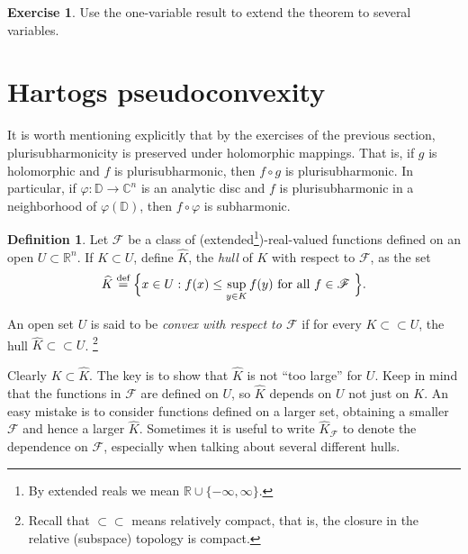 \documentclass[12pt,openany]{book}
\newcommand{\C}{{\mathbb{C}}}
\newcommand{\R}{{\mathbb{R}}}
\newcommand{\D}{{\mathbb{D}}}
\newcommand{\sF}{{\mathscr{F}}}
\newcommand{\myindex}[1]{#1\index{#1}}
\theoremstyle{plain}
\theoremstyle{remark}
\theoremstyle{definition}
\newtheorem{defn}[thm]{Definition}
\newenvironment{exbox}{%
    \def\FrameCommand{\vrule width 1pt \relax\hspace{10pt}}%
    \MakeFramed {\advance \hsize -\width \FrameRestore}%
}{%
    \endMakeFramed
}
\theoremstyle{exercise}
\newtheorem{exercise}{Exercise}[section]
\theoremstyle{example}
\begin{document}
\begin{exbox}
\begin{exercise}
Use the one-variable result to extend the theorem to several variables.
\end{exercise}
\end{exbox}


\section{Hartogs pseudoconvexity}

It is worth mentioning explicitly that by the
exercises of the previous section,
plurisubharmonicity is preserved under holomorphic mappings.
That is, if $g$ is holomorphic and $f$ is plurisubharmonic, then
$f \circ g$ is plurisubharmonic.  In particular, if $\varphi \colon \D \to
\C^n$ is an analytic disc and $f$ is plurisubharmonic in a neighborhood of
$\varphi(\D)$,
then $f \circ \varphi$ is subharmonic.

\begin{defn}
Let $\sF$ be a class of (extended\footnote{%
By extended reals we mean $\R \cup \{ -\infty,\infty\}$.})-real-valued
functions defined on an open $U \subset \R^n$.  If $K
\subset U$, define $\widehat{K}$, the \emph{\myindex{hull}} of $K$ with
respect to $\sF$, as the set
%
\begin{equation*}
\widehat{K} \overset{\text{def}}{=} \Bigl\{ x \in U : f(x) \leq \sup_{y\in K} f(y)
\text{ for all $f \in \sF$ } \Bigr\} .
\end{equation*}

An open set $U$ is said to be \emph{convex with respect to $\sF$}\index{convex!with respect to $\sF$}
if for every $K \subset \subset U$, the hull $\widehat{K} \subset \subset U$.%
\footnote{Recall that $\subset \subset$ means relatively compact, that is,
the closure in the relative (subspace) topology is compact.}
\end{defn}

Clearly $K \subset \widehat{K}$.  The key is to show that $\widehat{K}$
is not ``too large'' for $U$.
Keep in mind that the functions in $\sF$ are defined on $U$, so $\widehat{K}$
depends on $U$ not just on $K$.  An easy mistake is to consider functions defined
on a larger set, obtaining a smaller $\sF$ and hence a larger
$\widehat{K}$.  Sometimes it is useful to write $\widehat{K}_{\sF}$ to
denote the dependence on $\sF$, especially when talking about several different
hulls.
\end{document}
